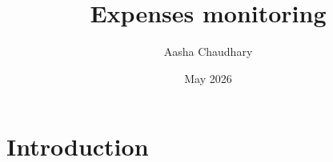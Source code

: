 \documentclass{article}
\title{Expenses monitoring}
\author{Aasha Chaudhary}
\date{May 2026}
\begin{document}
\maketitle

\section{Introduction}
\end{document}
